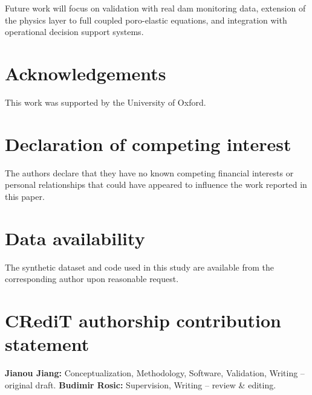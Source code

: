 \documentclass[preprint,12pt,review]{elsarticle}
\begin{document}
Future work will focus on validation with real dam monitoring data, extension of the physics layer to full coupled poro-elastic equations, and integration with operational decision support systems.

\section*{Acknowledgements}
This work was supported by the University of Oxford.

\section*{Declaration of competing interest}
The authors declare that they have no known competing financial interests or personal relationships that could have appeared to influence the work reported in this paper.

\section*{Data availability}
The synthetic dataset and code used in this study are available from the corresponding author upon reasonable request.

\section*{CRediT authorship contribution statement}
\textbf{Jianou Jiang:} Conceptualization, Methodology, Software, Validation, Writing -- original draft. \textbf{Budimir Rosic:} Supervision, Writing -- review \& editing.



\end{document}
